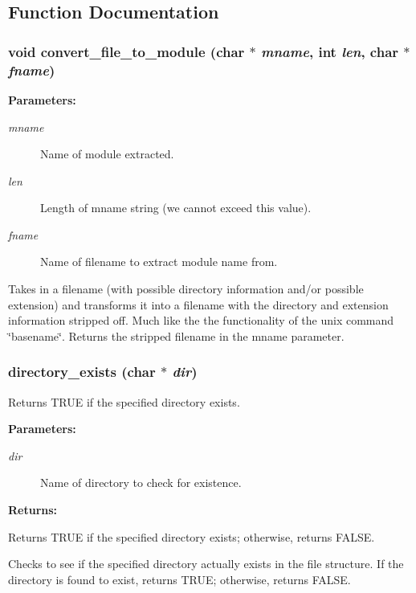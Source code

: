 \subsection{Function Documentation}
\subsubsection{\setlength{\rightskip}{0pt plus 5cm}void convert\_\-file\_\-to\_\-module (char $\ast$ {\em mname}, int {\em len}, char $\ast$ {\em fname})}\label{util_8c_a17}


\begin{Desc}
\item[{\bf Parameters: }]\par
\begin{description}
\item[
{\em mname}]Name of module extracted. \item[
{\em len}]Length of mname string (we cannot exceed this value). \item[
{\em fname}]Name of filename to extract module name from.

\end{description}
\end{Desc}
Takes in a filename (with possible directory information and/or possible extension) and transforms it into a filename with the directory and extension information stripped off. Much like the the functionality of the unix command \char`\"{}basename\char`\"{}. Returns the  stripped filename in the mname parameter. 
\subsubsection{ directory\_\-exists (char $\ast$ {\em dir})}\label{util_8c_a10}


Returns TRUE if the specified directory exists.

\begin{Desc}
\item[{\bf Parameters: }]\par
\begin{description}
\item[
{\em dir}]Name of directory to check for existence. \end{description}
\end{Desc}
\begin{Desc}
\item[{\bf Returns: }]\par
Returns TRUE if the specified directory exists; otherwise, returns FALSE.

\end{Desc}
Checks to see if the specified directory actually exists in the file structure. If the directory is found to exist, returns TRUE; otherwise, returns FALSE. 
